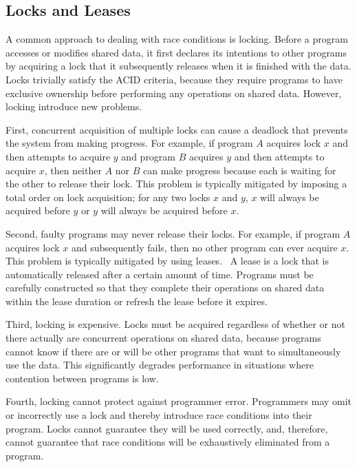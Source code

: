 \documentclass[../main.tex]{subfiles}
\begin{document}
  \subsection{Locks and Leases}
  A common approach to dealing with race conditions is locking. Before a program accesses or
  modifies shared data, it first declares its intentions to other programs by acquiring a
  lock that it subsequently releases when it is finished with the data. Locks trivially satisfy
  the ACID criteria, because they require programs to have exclusive ownership before performing any
  operations on shared data. However, locking introduce new problems.

  First, concurrent acquisition of multiple locks can cause a deadlock that prevents the system from
  making progress. For example, if program $A$ acquires lock $x$ and then attempts to acquire $y$
  and program $B$ acquires $y$ and then attempts to acquire $x$, then neither $A$ nor $B$ can make
  progress because each is waiting for the other to release their lock. This problem is typically
  mitigated by imposing a total order on lock acquisition; for any two locks $x$ and $y$, $x$ will
  always be acquired before $y$ or $y$ will always be acquired before $x$.

  Second, faulty programs may never release their locks. For example, if program $A$ acquires lock
  $x$ and subsequently fails, then no other program can ever acquire $x$. This problem is typically
  mitigated by using leases.~\cite{leases} A lease is a lock that is automatically released after a
  certain amount of time. Programs must be carefully constructed so that they complete their
  operations on shared data within the lease duration or refresh the lease before it expires.

  Third, locking is expensive. Locks must be acquired regardless of whether or not there actually
  are concurrent operations on shared data, because programs cannot know if there are or will be
  other programs that want to simultaneously use the data. This significantly degrades
  performance in situations where contention between programs is low.

  Fourth, locking cannot protect against programmer error. Programmers may omit or incorrectly use a
  lock and thereby introduce race conditions into their program. Locks cannot guarantee they will be
  used correctly, and, therefore, cannot guarantee that race conditions will be exhaustively
  eliminated from a program.
\end{document}
